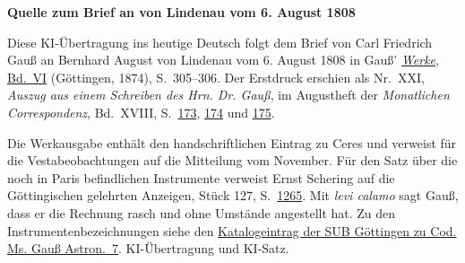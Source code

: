 \clearpage\thispagestyle{empty}
\begin{center}\textbf{Quelle zum Brief an von Lindenau vom 6. August 1808}\end{center}
\noindent Diese KI-Übertragung ins heutige Deutsch folgt dem Brief von Carl Friedrich Gauß an Bernhard August von Lindenau vom 6. August 1808 in Gauß’ \href{https://gdz.sub.uni-goettingen.de/id/PPN236007467}{\textit{Werke}, Bd.~VI} (Göttingen, 1874), S.~305--306. Der Erstdruck erschien als Nr.~XXI, \textit{Auszug aus einem Schreiben des Hrn. Dr. Gauß}, im Augustheft der \textit{Monatlichen Correspondenz}, Bd.~XVIII, S.~\href{https://www.digitale-sammlungen.de/en/view/bsb10538609?page=193}{173}, \href{https://www.digitale-sammlungen.de/en/view/bsb10538609?page=194}{174} und \href{https://www.digitale-sammlungen.de/en/view/bsb10538609?page=195}{175}.
\par\medskip
Die Werkausgabe enthält den handschriftlichen Eintrag zu Ceres und verweist für die Vestabeobachtungen auf die Mitteilung vom November. Für den Satz über die noch in Paris befindlichen Instrumente verweist Ernst Schering auf die Göttingischen gelehrten Anzeigen, Stück 127, S.~\href{https://manifests.sub.uni-goettingen.de/iiif/image/gdz:PPN319721507_1808:00001271/full/1600,/0/default.jpg}{1265}. Mit \textit{levi calamo} sagt Gauß, dass er die Rechnung rasch und ohne Umstände angestellt hat. Zu den Instrumentenbezeichnungen siehe den \href{https://kalliope.staatsbibliothek-berlin.de/ead?ead.id=DE-611-HS-3300344}{Katalogeintrag der SUB Göttingen zu Cod. Ms. Gauß Astron.~7}. KI-Übertragung und KI-Satz.
\clearpage
